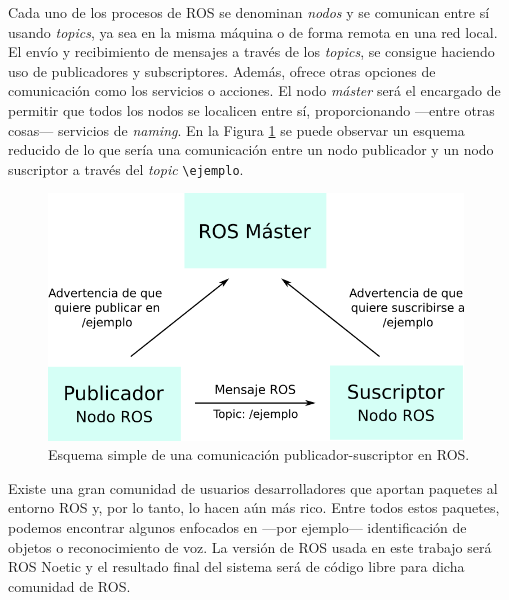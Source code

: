 Cada uno de los procesos de ROS se denominan \textit{nodos} y se comunican entre sí usando \textit{topics}, ya sea en la misma máquina o de forma remota en una red local. El envío y recibimiento de mensajes a través de los \textit{topics}, se consigue haciendo uso de publicadores y subscriptores. Además, ofrece otras opciones de comunicación como los servicios o acciones. El nodo \textit{máster} será el encargado de permitir que todos los nodos se localicen entre sí, proporcionando ---entre otras cosas--- servicios de \textit{naming}. En la Figura \ref{fig:ros} se puede observar un esquema reducido de lo que sería una comunicación entre un nodo publicador y un nodo suscriptor a través del \textit{topic} \verb|\ejemplo|.\\

\begin{figure} [h!]
  \begin{center}
    \includegraphics[width=11cm]{figs/ros.png}
  \end{center}
  \captionsetup{justification=centering}
  \caption{Esquema simple de una comunicación publicador-suscriptor en ROS.}
  \label{fig:ros}
\end{figure}

Existe una gran comunidad de usuarios desarrolladores que aportan paquetes al entorno ROS y, por lo tanto, lo hacen aún más rico. Entre todos estos paquetes, podemos encontrar algunos enfocados en ---por ejemplo--- identificación de objetos o reconocimiento de voz. La versión de ROS usada en este trabajo será ROS Noetic y el resultado final del sistema será de código libre para dicha comunidad de ROS.